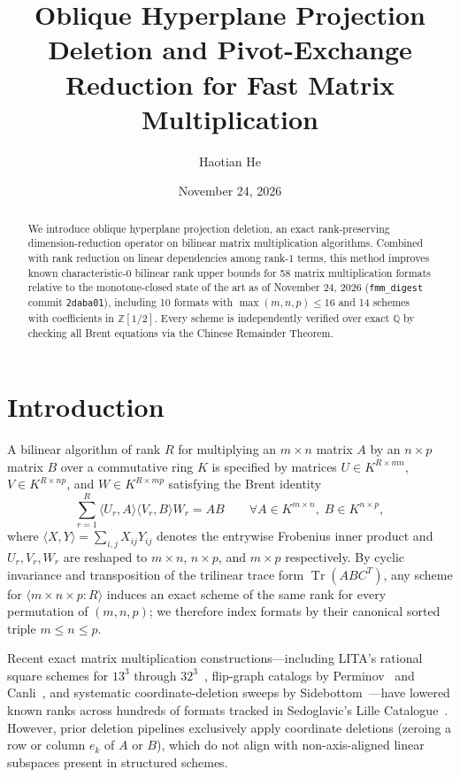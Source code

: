 \documentclass[11pt,a4paper]{article}
\title{\textbf{Oblique Hyperplane Projection Deletion and Pivot-Exchange Reduction for Fast Matrix Multiplication}}
\author{Haotian He}
\date{November 24, 2026}
\begin{document}
\maketitle

\begin{abstract}
We introduce oblique hyperplane projection deletion, an exact rank-preserving dimension-reduction operator on bilinear matrix multiplication algorithms. Combined with rank reduction on linear dependencies among rank-$1$ terms, this method improves known characteristic-$0$ bilinear rank upper bounds for 58 matrix multiplication formats relative to the monotone-closed state of the art as of November 24, 2026 (\texttt{fmm\_digest} commit \texttt{2daba01}), including 10 formats with $\max(m,n,p)\le 16$ and 14 schemes with coefficients in $\mathbb{Z}[1/2]$. Every scheme is independently verified over exact $\mathbb{Q}$ by checking all Brent equations via the Chinese Remainder Theorem.
\end{abstract}

\section{Introduction}
A bilinear algorithm of rank $R$ for multiplying an $m\times n$ matrix $A$ by an $n\times p$ matrix $B$ over a commutative ring $K$ is specified by matrices $U \in K^{R\times mn}$, $V \in K^{R\times np}$, and $W \in K^{R\times mp}$ satisfying the Brent identity
\begin{equation}
\sum_{r=1}^R \langle U_r, A\rangle \langle V_r, B\rangle W_r = AB
\qquad \forall A \in K^{m\times n},\; B \in K^{n\times p},
\end{equation}
where $\langle X, Y\rangle = \sum_{i,j} X_{ij} Y_{ij}$ denotes the entrywise Frobenius inner product and $U_r, V_r, W_r$ are reshaped to $m\times n$, $n\times p$, and $m\times p$ respectively. By cyclic invariance and transposition of the trilinear trace form $\operatorname{Tr}(ABC^T)$, any scheme for $\langle m\times n\times p : R\rangle$ induces an exact scheme of the same rank for every permutation of $(m,n,p)$; we therefore index formats by their canonical sorted triple $m \le n \le p$.

Recent exact matrix multiplication constructions---including LITA's rational square schemes for $13^3$ through $32^3$~\cite{lita2026}, flip-graph catalogs by Perminov~\cite{perminov2026} and Canli~\cite{quantavane2026}, and systematic coordinate-deletion sweeps by Sidebottom~\cite{sidebottom2026}---have lowered known ranks across hundreds of formats tracked in Sedoglavic's Lille Catalogue~\cite{sedoglavic2026}. However, prior deletion pipelines exclusively apply coordinate deletions (zeroing a row or column $e_k$ of $A$ or $B$), which do not align with non-axis-aligned linear subspaces present in structured schemes.
\end{document}
